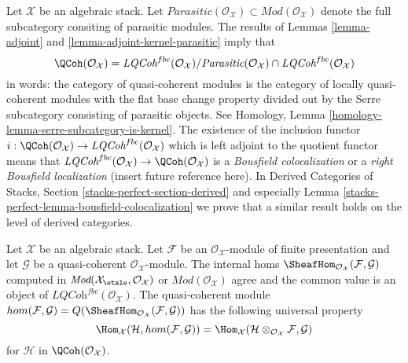 \begin{remark}
\label{remark-bousfield-colocalization}
Let $\mathcal{X}$ be an algebraic stack. Let
$\textit{Parasitic}(\mathcal{O}_\mathcal{X}) \subset
\textit{Mod}(\mathcal{O}_\mathcal{X})$ denote the
full subcategory consiting of parasitic modules. The results of
Lemmas \ref{lemma-adjoint} and \ref{lemma-adjoint-kernel-parasitic}
imply that
$$
\QCoh(\mathcal{O}_\mathcal{X}) =
\textit{LQCoh}^{fbc}(\mathcal{O}_\mathcal{X}) /
\textit{Parasitic}(\mathcal{O}_\mathcal{X})
\cap \textit{LQCoh}^{fbc}(\mathcal{O}_\mathcal{X})
$$
in words: the category of quasi-coherent modules is the category
of locally quasi-coherent modules with the flat base change property
divided out by the Serre subcategory consisting of parasitic objects.
See Homology, Lemma \ref{homology-lemma-serre-subcategory-is-kernel}.
The existence of the inclusion functor
$i : \QCoh(\mathcal{O}_\mathcal{X}) \to
\textit{LQCoh}^{fbc}(\mathcal{O}_\mathcal{X})$
which is left adjoint to the quotient functor means that
$\textit{LQCoh}^{fbc}(\mathcal{O}_\mathcal{X}) \to
\QCoh(\mathcal{O}_\mathcal{X})$
is a {\it Bousfield colocalization} or a {\it right Bousfield localization}
(insert future reference here). In Derived Categories of Stacks, Section
\ref{stacks-perfect-section-derived} and especially
Lemma \ref{stacks-perfect-lemma-bousfield-colocalization}
we prove that a similar result holds on the level of derived categories.
\end{remark}

\begin{lemma}
\label{lemma-internal-hom-fp-into-qcoh}
Let $\mathcal{X}$ be an algebraic stack. Let $\mathcal{F}$ be an
$\mathcal{O}_\mathcal{X}$-module of finite presentation and let
$\mathcal{G}$ be a quasi-coherent $\mathcal{O}_\mathcal{X}$-module.
The internal homs
$\SheafHom_{\mathcal{O}_\mathcal{X}}(\mathcal{F}, \mathcal{G})$
computed in
$\textit{Mod}(\mathcal{X}_\etale, \mathcal{O}_\mathcal{X})$ or
$\textit{Mod}(\mathcal{O}_\mathcal{X})$ agree and the common value
is an object of $\textit{LQCoh}^{fbc}(\mathcal{O}_\mathcal{X})$.
The quasi-coherent module
$
hom(\mathcal{F}, \mathcal{G}) =
Q(\SheafHom_{\mathcal{O}_\mathcal{X}}(\mathcal{F}, \mathcal{G}))
$
has the following universal property
$$
\Hom_\mathcal{X}(\mathcal{H}, hom(\mathcal{F}, \mathcal{G})) =
\Hom_\mathcal{X}(\mathcal{H} \otimes_{\mathcal{O}_\mathcal{X}} \mathcal{F},
\mathcal{G})
$$
for $\mathcal{H}$ in $\QCoh(\mathcal{O}_\mathcal{X})$.
\end{lemma}

